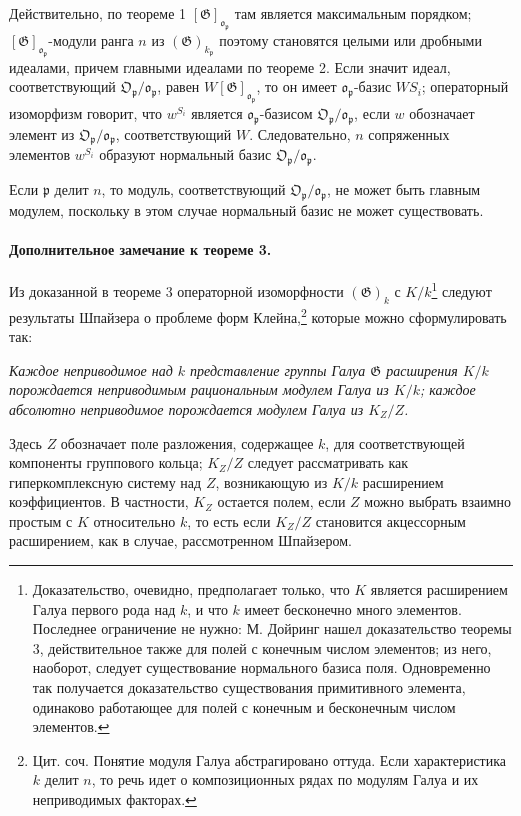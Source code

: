 \documentclass[11pt]{article}
\providecommand{\frakO}{\mathfrak{O}}
\providecommand{\frako}{\mathfrak{o}}
\providecommand{\frakp}{\mathfrak{p}}
\providecommand{\Gg}{\mathfrak{G}}
\begin{document}
Действительно, по теореме 1 \([\Gg]_{\frako_\frakp}\) там является максимальным порядком; \([\Gg]_{\frako_\frakp}\)-модули ранга \(n\) из \((\Gg)_{k_\frakp}\) поэтому становятся целыми или дробными идеалами, причем главными идеалами по теореме 2. Если значит идеал, соответствующий \(\frakO_\frakp/\frako_\frakp\), равен \(W[\Gg]_{\frako_\frakp}\), то он имеет \(\frako_\frakp\)-базис \(WS_i\); операторный изоморфизм говорит, что \(w^{S_i}\) является \(\frako_\frakp\)-базисом \(\frakO_\frakp/\frako_\frakp\), если \(w\) обозначает элемент из \(\frakO_\frakp/\frako_\frakp\), соответствующий \(W\). Следовательно, \(n\) сопряженных элементов \(w^{S_i}\) образуют нормальный базис \(\frakO_\frakp/\frako_\frakp\).

Если \(\frakp\) делит \(n\), то модуль, соответствующий \(\frakO_\frakp/\frako_\frakp\), не может быть главным модулем, поскольку в этом случае нормальный базис не может существовать.

\paragraph{Дополнительное замечание к теореме 3.}
Из доказанной в теореме 3 операторной изоморфности \((\Gg)_k\) с \(K/k\)\footnote{Доказательство, очевидно, предполагает только, что \(K\) является расширением Галуа первого рода над \(k\), и что \(k\) имеет бесконечно много элементов. Последнее ограничение не нужно: М. Дойринг нашел доказательство теоремы 3, действительное также для полей с конечным числом элементов; из него, наоборот, следует существование нормального базиса поля. Одновременно так получается доказательство существования примитивного элемента, одинаково работающее для полей с конечным и бесконечным числом элементов.} следуют результаты Шпайзера о проблеме форм Клейна,\footnote{Цит. соч. Понятие модуля Галуа абстрагировано оттуда. Если характеристика \(k\) делит \(n\), то речь идет о композиционных рядах по модулям Галуа и их неприводимых факторах.} которые можно сформулировать так:

\emph{Каждое неприводимое над \(k\) представление группы Галуа \(\Gg\) расширения \(K/k\) порождается неприводимым рациональным модулем Галуа из \(K/k\); каждое абсолютно неприводимое порождается модулем Галуа из \(K_Z/Z\).}

Здесь \(Z\) обозначает поле разложения, содержащее \(k\), для соответствующей компоненты группового кольца; \(K_Z/Z\) следует рассматривать как гиперкомплексную систему над \(Z\), возникающую из \(K/k\) расширением коэффициентов. В частности, \(K_Z\) остается полем, если \(Z\) можно выбрать взаимно простым с \(K\) относительно \(k\), то есть если \(K_Z/Z\) становится акцессорным расширением, как в случае, рассмотренном Шпайзером.
\end{document}
